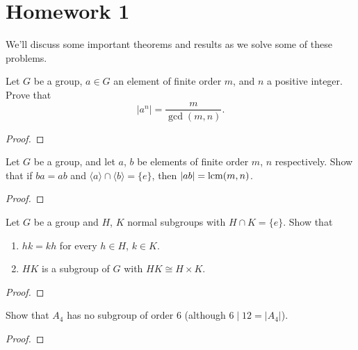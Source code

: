 \chapter{Homework 1}
We'll discuss some important theorems and results as we solve some of these
problems.
\begin{problem}
Let $G$ be a group, $a\in G$ an element of finite order $m$, and $n$ a
positive integer. Prove that
\[
|a^n|=\frac{m}{\gcd(m,n)}.
\]
\end{problem}
\begin{proof}

\end{proof}

\begin{problem}
Let $G$ be a group, and let $a$, $b$ be elements of finite order $m$, $n$
respectively. Show that if $ba=ab$ and $\langle a\rangle\cap\langle
b\rangle=\{e\}$, then $|ab|=\operatorname{lcm}(m,n)$.
\end{problem}
\begin{proof}
\end{proof}

\begin{problem}
Let $G$ be a group and $H$, $K$ normal subgroups with $H\cap K=\{e\}$. Show
that
\begin{enumerate}[label=(\alph*)]
\item $hk=kh$ for every $h\in H$, $k\in K$.
\item $HK$ is a subgroup of $G$ with $HK\cong H\times K$.
\end{enumerate}
\end{problem}
\begin{proof}
\end{proof}

\begin{problem}
Show that $A_4$ has no subgroup of order $6$ (although $6\mid 12=|A_4|$).
\end{problem}
\begin{proof}
\end{proof}

